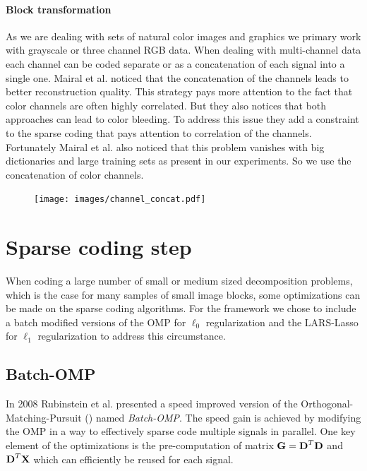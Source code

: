 \paragraph{Block transformation} As we are dealing with sets of natural
color images and graphics we primary work with grayscale or three
channel RGB data. 
When dealing with multi-channel data each channel can be coded
separate or as a concatenation of each signal into a single one. Mairal et
al.\cite{mairal08sparse} noticed that the concatenation of the channels leads
to better reconstruction quality. This strategy pays more attention to the fact
that color channels are often highly correlated. But they also notices that both
approaches can lead to color bleeding.  
To address this issue they add a constraint to the sparse coding that pays
attention to correlation of the channels. 
Fortunately Mairal et al. also noticed that this problem vanishes with big
dictionaries and large training sets as present in our experiments. So we use
the concatenation of color channels. 

\begin{figure}[h]
\centering
\texttt{[image: images/channel\_concat.pdf]}
\label{fig:separation}
\end{figure}


\section{Sparse coding step}
When coding a large number of small or medium sized decomposition problems,
which is the case for many samples of small image blocks, some optimizations can
be made on the sparse coding algorithms. 
For the framework we chose to include a batch modified versions of the OMP for
$\ell_0$ regularization and the LARS-Lasso for $\ell_1$ regularization to
address this circumstance. 

\subsection{Batch-OMP}
In 2008 Rubinstein et al.\cite{Rubinstein2008} presented a speed improved
version of the Orthogonal-Matching-Pursuit () named
\emph{Batch-OMP}. The speed gain is achieved by modifying the OMP in a way to
effectively sparse code multiple signals in parallel. One key element of the
optimizations is the pre-computation of matrix $\boldsymbol{\mathrm{G}}=\boldsymbol{\mathrm{D}}^T\boldsymbol{\mathrm{D}}$ and
$\boldsymbol{\mathrm{D}}^T\boldsymbol{\mathrm{X}}$ which can efficiently be reused for each signal. 

